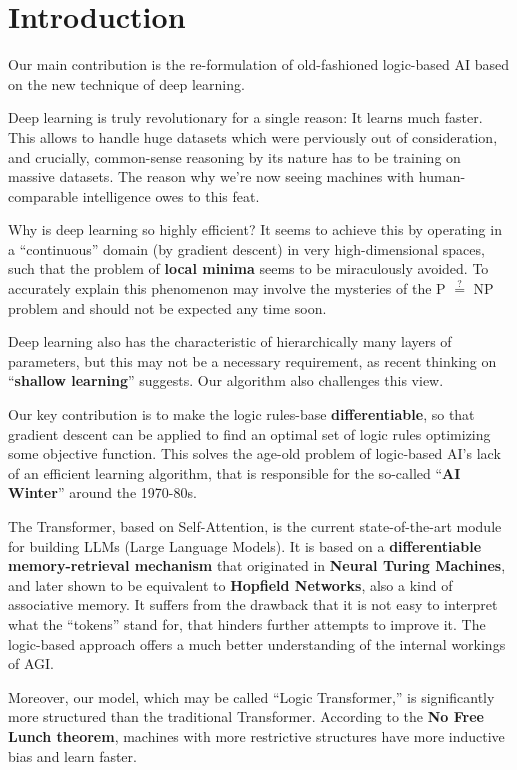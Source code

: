 \chapter{Introduction}\label{chap:introduction}

Our main contribution is the re-formulation of old-fashioned logic-based AI based on the new technique of deep learning.

Deep learning is truly revolutionary for a single reason:  It learns much faster.  This allows to handle huge datasets which were perviously out of consideration, and crucially, common-sense reasoning by its nature has to be training on massive datasets.  The reason why we're now seeing machines with human-comparable intelligence owes to this feat.  

Why is deep learning so highly efficient?  It seems to achieve this by operating in a ``continuous'' domain (by gradient descent) in very high-dimensional spaces, such that the problem of \textbf{local minima} seems to be miraculously avoided.  To accurately explain this phenomenon may involve the mysteries of the P $\stackrel{?}{=}$ NP problem and should not be expected any time soon.

Deep learning also has the characteristic of hierarchically many layers of parameters, but this may not be a necessary requirement, as recent thinking on ``\textbf{shallow learning}'' suggests.  Our algorithm also challenges this view.

Our key contribution is to make the logic rules-base \textbf{differentiable}, so that gradient descent can be applied to find an optimal set of logic rules optimizing some objective function.  This solves the age-old problem of logic-based AI's lack of an efficient learning algorithm, that is responsible for the so-called ``\textbf{AI Winter}'' around the 1970-80s.

The Transformer, based on Self-Attention, is the current state-of-the-art module for building LLMs (Large Language Models).  It is based on a \textbf{differentiable memory-retrieval mechanism} that originated in \textbf{Neural Turing Machines}, and later shown to be equivalent to \textbf{Hopfield Networks}, also a kind of associative memory.  It suffers from the drawback that it is not easy to interpret what the ``tokens'' stand for, that hinders further attempts to improve it.  The logic-based approach offers a much better understanding of the internal workings of AGI.

Moreover, our model, which may be called ``Logic Transformer,'' is significantly more structured than the traditional Transformer.  According to the \textbf{No Free Lunch theorem}, machines with more restrictive structures have more inductive bias and learn faster.

